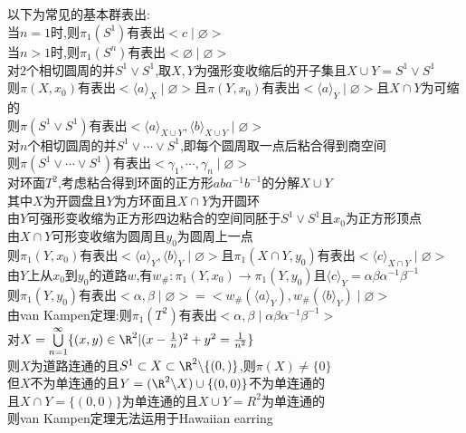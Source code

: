 \begin{zhu}
以下为常见的基本群表出:\\
当$n=1$时,则$\pi_1(S^{1})$有表出$<c\mid\varnothing>$\\
当$n>1$时,则$\pi_1(S^{n})$有表出$<\varnothing\mid\varnothing>$\\
对$2$个相切圆周的并$S^{1}\vee S^{1}$,取$X,Y$为强形变收缩后的开子集且$X\cup Y=S^{1}\vee S^{1}$\\
则$\pi(X,x_0)$有表出$<\langle a\rangle_{X}\mid\varnothing>$且$\pi(Y,x_0)$有表出$<\langle a\rangle_{Y}\mid\varnothing>$且$X\cap Y$为可缩的\\
则$\pi(S^{1}\vee S^{1})$有表出$<\langle a\rangle_{X\cup Y},\langle b\rangle_{X\cup Y}\mid\varnothing>$\\
对$n$个相切圆周的并$S^{1}\vee\cdots\vee S^{1}$,即每个圆周取一点后粘合得到商空间\\
则$\pi(S^{1}\vee\cdots\vee S^{1})$有表出$<\gamma_1,\cdots,\gamma_n\mid\varnothing>$\\
对环面$T^2$,考虑粘合得到环面的正方形$aba^{-1}b^{-1}$的分解$X\cup Y$\\
其中$X$为开圆盘且$Y$为方环面且$X\cap Y$为开圆环\\
由$Y$可强形变收缩为正方形四边粘合的空间同胚于$S^{1}\vee S^{1}$且$x_0$为正方形顶点\\
由$X\cap Y$可形变收缩为圆周且$y_0$为圆周上一点\\
则$\pi_1(Y,x_0)$有表出$<\langle a\rangle_{Y},\langle b\rangle_{Y}\mid\varnothing>$且$\pi_1(X\cap Y,y_0)$有表出$<\langle c\rangle_{X\cap Y}\mid\varnothing>$\\
由$Y$上从$x_0$到$y_0$的道路$w$,有$w_{\#}:\pi_1(Y,x_0)\to\pi_1(Y,y_0)$且$\langle c\rangle_{Y}=\alpha\beta\alpha^{-1}\beta^{-1}$\\
则$\pi_1(Y,y_0)$有表出$<\alpha,\beta\mid\varnothing>=<w_{\#}(\langle a\rangle_{Y}),w_{\#}(\langle b\rangle_{Y})\mid\varnothing>$\\
由van Kampen定理:则$\pi_1(T^2)$有表出$<\alpha,\beta\mid\alpha\beta\alpha^{-1}\beta^{-1}>$\\
对$X=\bigcup\limits_{n=1}^{\infty}\{(x,y)\in\R^2|(x-\frac{1}{n})^2+y^2=\frac{1}{n^2}\}$\\
则$X$为道路连通的且$S^{1}\subset X\subset\R^2\backslash\{(0,)\}$,则$\pi(X)\neq\{0\}$\\
但$X$不为单连通的且$Y=(\R^2\backslash X)\cup\{(0,0)\}$不为单连通的\\
且$X\cap Y=\{(0,0)\}$为单连通的且$X\cup Y=R^2$为单连通的\\
则van Kampen定理无法运用于Hawaiian earring
\end{zhu}


